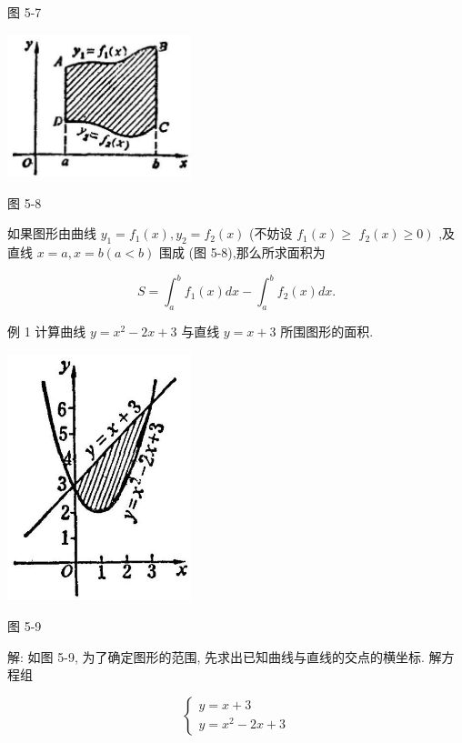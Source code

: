 \documentclass[lang=cn,newtx,12pt,scheme=chinese]{elegantbook}
\begin{document}
图 5-7

\begin{center}
\includegraphics[max width=0.4\textwidth]{images/01912c18-5c3f-733d-b775-749ba9897a9d_232_995714.jpg}
\end{center}

图 5-8

如果图形由曲线 \({y}_{1} = {f}_{1}\left( x\right) ,{y}_{2} = {f}_{2}\left( x\right)\) (不妨设 \({f}_{1}\left( x\right) \geq\) \(\left. {{f}_{2}\left( x\right) \geq 0}\right)\) ,及直线 \(x = a,x = b\left( {a < b}\right)\) 围成 (图 5-8),那么所求面积为

\[
S = {\int }_{a}^{b}{f}_{1}\left( x\right) {dx} - {\int }_{a}^{b}{f}_{2}\left( x\right) {dx}.
\]

例 1 计算曲线 \(y = {x}^{2} - {2x} + 3\) 与直线 \(y = x + 3\) 所围图形的面积.

\begin{center}
\includegraphics[max width=0.4\textwidth]{images/01912c18-5c3f-733d-b775-749ba9897a9d_232_503568.jpg}
\end{center}

图 5-9

解: 如图 5-9, 为了确定图形的范围, 先求出已知曲线与直线的交点的横坐标. 解方程组

\[
\left\{ \begin{array}{l} y = x + 3 \\ y = {x}^{2} - {2x} + 3 \end{array}\right.
\]
\end{document}
